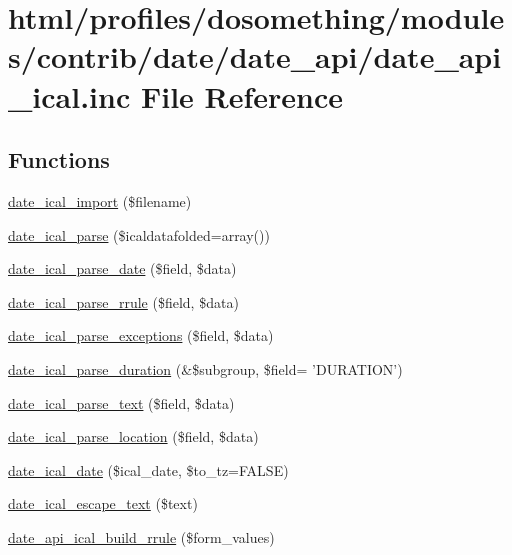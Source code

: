\hypertarget{date__api__ical_8inc}{
\section{html/profiles/dosomething/modules/contrib/date/date\_\-api/date\_\-api\_\-ical.inc File Reference}
\label{date__api__ical_8inc}
}
\subsection*{Functions}
\begin{DoxyCompactItemize}
\item 
\hyperlink{date__api__ical_8inc_a9c32ef84b7717c5f5b9333a14aab9e17}{date\_\-ical\_\-import} (\$filename)
\item 
\hyperlink{date__api__ical_8inc_af4aa5783fc7056e99b6e0fc0d981cda4}{date\_\-ical\_\-parse} (\$icaldatafolded=array())
\item 
\hyperlink{date__api__ical_8inc_a043a6a7b1c9724a27cd16750f01492c4}{date\_\-ical\_\-parse\_\-date} (\$field, \$data)
\item 
\hyperlink{date__api__ical_8inc_adaf397fd219714e7a7fd430e179ee592}{date\_\-ical\_\-parse\_\-rrule} (\$field, \$data)
\item 
\hyperlink{date__api__ical_8inc_a6f1c803e50f78faab69c8348c1dd8c1f}{date\_\-ical\_\-parse\_\-exceptions} (\$field, \$data)
\item 
\hyperlink{date__api__ical_8inc_a8a63c8aa2158e701b01217637169440d}{date\_\-ical\_\-parse\_\-duration} (\&\$subgroup, \$field= 'DURATION')
\item 
\hyperlink{date__api__ical_8inc_ae0b819676bd9cec8f5a6a8d71b82c117}{date\_\-ical\_\-parse\_\-text} (\$field, \$data)
\item 
\hyperlink{date__api__ical_8inc_a28db1e5fc29fc45ff15e1bdab89235d5}{date\_\-ical\_\-parse\_\-location} (\$field, \$data)
\item 
\hyperlink{date__api__ical_8inc_a8b0b84eff1d472110d9152574b1b390e}{date\_\-ical\_\-date} (\$ical\_\-date, \$to\_\-tz=FALSE)
\item 
\hyperlink{date__api__ical_8inc_af17a30f380d9be0902300cd7bfc5eaa0}{date\_\-ical\_\-escape\_\-text} (\$text)
\item 
\hyperlink{date__api__ical_8inc_ad49735896adc89955afb8e8df6d16b51}{date\_\-api\_\-ical\_\-build\_\-rrule} (\$form\_\-values)
\end{DoxyCompactItemize}


